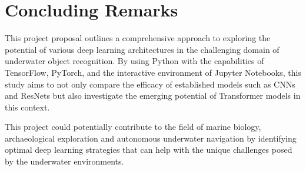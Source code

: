 \section{Concluding Remarks}

This project proposal outlines a comprehensive approach to exploring the
potential of various deep learning architectures in the challenging domain of
underwater object recognition.
By using Python with the capabilities of TensorFlow, PyTorch,
and the interactive environment of Jupyter Notebooks, this study aims to not
only compare the efficacy of established models such as CNNs and ResNets but
also investigate the emerging potential of Transformer models in this context.

This project could potentially contribute to the field of marine biology,
archaeological exploration and autonomous underwater navigation by identifying
optimal deep learning strategies that can help with the unique challenges
posed by the underwater environments.

